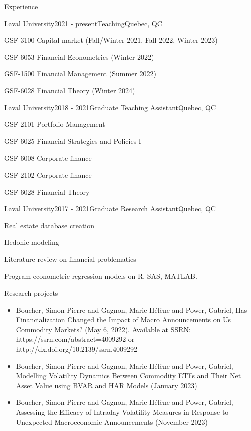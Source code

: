 \documentclass{resume} %
\begin{document}
\begin{rSection}{Experience}

\begin{rSubsection}{Laval University}{2021 - present}{Teaching}{Quebec, QC}
\item GSF-3100 Capital market (Fall/Winter 2021, Fall 2022, Winter 2023)
\item GSF-6053 Financial Econometrics (Winter 2022)
\item GSF-1500 Financial Management (Summer 2022)
\item GSF-6028 Financial Theory (Winter 2024)
\end{rSubsection}




\begin{rSubsection}{Laval University}{2018 - 2021}{Graduate Teaching Assistant}{Quebec, QC}
\item GSF-2101 Portfolio Management
\item GSF-6025 Financial Strategies and Policies I
\item GSF-6008 Corporate finance
\item GSF-2102 Corporate finance
\item GSF-6028 Financial Theory
\end{rSubsection}

\begin{rSubsection}{Laval University}{2017 - 2021}{Graduate Research Assistant}{Quebec, QC}
\item Real estate database creation
\item Hedonic modeling
\item Literature review on financial problematics
\item Program econometric regression models on R, SAS, MATLAB.
\end{rSubsection}

\end{rSection}


\begin{rSection}{Research projects}
\begin{itemize}
\item Boucher, Simon-Pierre and Gagnon, Marie-Hélène and Power, Gabriel, Has Financialization Changed the Impact of Macro Announcements on Us Commodity Markets? (May 6, 2022). Available at SSRN: https://ssrn.com/abstract=4009292 or http://dx.doi.org/10.2139/ssrn.4009292
\item Boucher, Simon-Pierre and Gagnon, Marie-Hélène and Power, Gabriel, Modelling Volatility Dynamics Between Commodity ETFs and Their Net Asset Value using BVAR and HAR Models (January 2023)
\item Boucher, Simon-Pierre and Gagnon, Marie-Hélène and Power, Gabriel, Assessing the Efficacy of Intraday Volatility Measures in Response to Unexpected Macroeconomic Announcements (November 2023)
\end{itemize}
\end{rSection}
\end{document}
